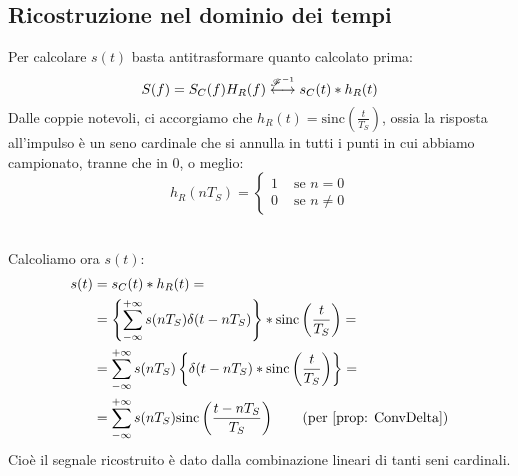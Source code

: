 \subsection{Ricostruzione nel dominio dei tempi}
Per calcolare $s(t)$ basta antitrasformare quanto calcolato prima:
\begin{equation}
    S(f) = S_C(f)H_R(f) \overset{{\mathscr{F}}^{-1}}{\longleftrightarrow}  s_C(t) \ast h_R(t)
\end{equation}
Dalle coppie notevoli, ci accorgiamo che $h_R(t) = \text{sinc}\left(\frac{t}{T_S}\right)$, ossia la risposta all'impulso è un 
seno cardinale che si annulla in tutti i punti in cui abbiamo campionato, tranne che in 0, o meglio:
\begin{equation}
    h_R(nT_S) = \begin{cases}
        1 & \text{ se } n = 0\\
        0 & \text{ se } n \neq 0
    \end{cases}
\end{equation}\\

Calcoliamo ora $s(t)$:
\begin{align*}
    s(t) &= s_C(t) \ast h_R(t) = \\
         &= \left\{ \sum_{-\infty}^{+\infty} s(nT_S) \delta(t - nT_S)\right\} \ast \text{sinc}\left(\frac{t}{T_S}\right) = \\
         &= \sum_{-\infty}^{+\infty} s(nT_S)\left\{  \delta(t - nT_S) \ast \text{sinc}\left(\frac{t}{T_S}\right)\right\} = \\ 
         &= \sum_{-\infty}^{+\infty} s(nT_S) \text{sinc}\left(\frac{t - nT_S}{T_S}\right) \tag{per \eqref{prop: ConvDelta}}
\end{align*}
Cioè il segnale ricostruito è dato dalla combinazione lineari di tanti seni cardinali.

